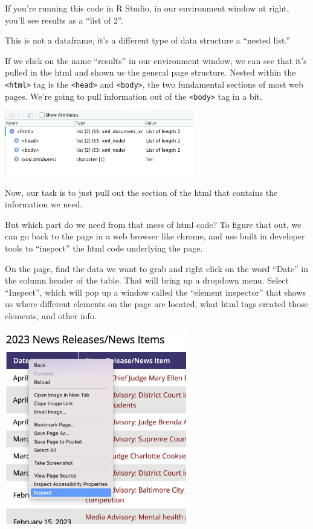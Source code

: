 \documentclass[
  letterpaper,
  DIV=11,
  numbers=noendperiod]{scrreprt}
\begin{document}
If you're running this code in R Studio, in our environment window at
right, you'll see results as a ``list of 2''.

This is not a dataframe, it's a different type of data structure a
``nested list.''

If we click on the name ``results'' in our environment window, we can
see that it's pulled in the html and shown us the general page
structure. Nested within the \texttt{\textless{}html\textgreater{}} tag
is the \texttt{\textless{}head\textgreater{}} and
\texttt{\textless{}body\textgreater{}}, the two fundamental sections of
most web pages. We're going to pull information out of the
\texttt{\textless{}body\textgreater{}} tag in a bit.

\includegraphics[width=3.25in,height=\textheight]{./images/rvest3.png}

Now, our task is to just pull out the section of the html that contains
the information we need.

But which part do we need from that mess of html code? To figure that
out, we can go back to the page in a web browser like chrome, and use
built in developer tools to ``inspect'' the html code underlying the
page.

On the page, find the data we want to grab and right click on the word
``Date'' in the column header of the table. That will bring up a
dropdown menu. Select ``Inspect'', which will pop up a window called the
``element inspector'' that shows us where different elements on the page
are located, what html tags created those elements, and other info.

\includegraphics[width=3.13in,height=\textheight]{./images/rvest4.png}
\end{document}

